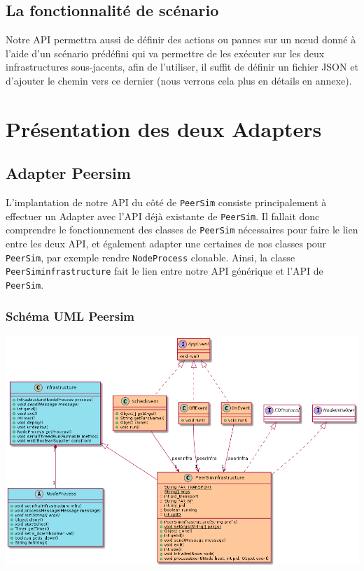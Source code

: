 \documentclass{article}
\begin{document}
					\subsection{La fonctionnalité de scénario}
					Notre API permettra aussi de définir des actions ou pannes sur un nœud donné à l'aide d'un scénario prédéfini qui va permettre de les exécuter sur les deux infrastructures sous-jacents,
					afin de l'utiliser, il suffit de définir un fichier JSON et d'ajouter le chemin vers ce dernier (nous verrons cela plus en détails en annexe).
		
		

				\section{Présentation des deux Adapters}
				
				\subsection{Adapter Peersim}
				L'implantation de notre API du côté de \verb|PeerSim| consiste principalement à effectuer un Adapter avec l'API déjà existante de \verb|PeerSim|. Il fallait donc comprendre le fonctionnement des classes de \verb|PeerSim| nécessaires pour faire le lien entre les deux API,  
				et également adapter une certaines de nos classes pour \verb|PeerSim|, par exemple rendre \verb|NodeProcess| clonable. 
				\newline
				Ainsi, la classe \verb|PeerSiminfrastructure| fait le lien entre notre API générique et l'API de \verb|PeerSim|.
					\subsubsection{Schéma UML Peersim}
					\hspace*{-1.3cm} \includegraphics[width=17cm]{uml/peersim1.png}
\end{document}
